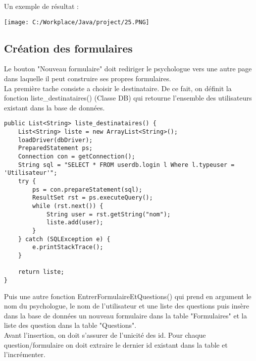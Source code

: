 \documentclass[12]{article}
\begin{document}
Un exemple de résultat :


\begin{center}
\texttt{[image: C:/Workplace/Java/project/25.PNG]}
\end{center}



\subsection{Création des formulaires}



Le bouton "Nouveau formulaire" doit rediriger le psychologue vers une autre page dans laquelle il peut construire ses propres formulaires.\\

La première tache consiste a choisir le destinataire. De ce fait, on définit la fonction liste\_destinataires() (Classe DB) qui retourne l'ensemble des utilisateurs existant dans la base de données.
\newpage



\begin{scriptsize}
\lstset{language=java}
\begin{lstlisting}
public List<String> liste_destinataires() {
	List<String> liste = new ArrayList<String>();
	loadDriver(dbDriver);
	PreparedStatement ps;
	Connection con = getConnection();
	String sql = "SELECT * FROM userdb.login l Where l.typeuser = 'Utilisateur'";
	try {
		ps = con.prepareStatement(sql);
		ResultSet rst = ps.executeQuery();
		while (rst.next()) {
			String user = rst.getString("nom");
			liste.add(user);
		}
	} catch (SQLException e) {
		e.printStackTrace();
	}

	return liste;
}
\end{lstlisting}
\end{scriptsize}



Puis une autre fonction EntrerFormulaireEtQuestions() qui prend en argument le nom du psychologue, le nom de l'utilisateur et une liste des questions puis insère dans la base de données un nouveau formulaire dans la table "Formulaires" et la liste des question dans la table "Questions".\\

Avant l'insertion, on doit s'assurer de l'unicité des id. Pour chaque question/formulaire on doit extraire le dernier id existant dans la table et l'incrémenter.
\end{document}
